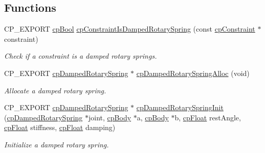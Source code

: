 \subsection*{Functions}
\begin{DoxyCompactItemize}
\item 
\mbox{\label{group__cp_damped_rotary_spring_ga699106f2d1aa35ac5ab214c4a5dd5a09}} 
C\+P\+\_\+\+E\+X\+P\+O\+RT \mbox{\hyperlink{group__basic_types_gabc5e752c48f3449ca26ef413ecbd647e}{cp\+Bool}} \mbox{\hyperlink{group__cp_damped_rotary_spring_ga699106f2d1aa35ac5ab214c4a5dd5a09}{cp\+Constraint\+Is\+Damped\+Rotary\+Spring}} (const \mbox{\hyperlink{structcp_constraint}{cp\+Constraint}} $\ast$constraint)
\begin{DoxyCompactList}\small\item\em Check if a constraint is a damped rotary springs. \end{DoxyCompactList}\item 
\mbox{\label{group__cp_damped_rotary_spring_ga7c383845b0947b2bb7140d9d5cc7c6fc}} 
C\+P\+\_\+\+E\+X\+P\+O\+RT \mbox{\hyperlink{structcp_damped_rotary_spring}{cp\+Damped\+Rotary\+Spring}} $\ast$ \mbox{\hyperlink{group__cp_damped_rotary_spring_ga7c383845b0947b2bb7140d9d5cc7c6fc}{cp\+Damped\+Rotary\+Spring\+Alloc}} (void)
\begin{DoxyCompactList}\small\item\em Allocate a damped rotary spring. \end{DoxyCompactList}\item 
\mbox{\label{group__cp_damped_rotary_spring_ga7e22b1d0c2bce96d499b356a7bc42104}} 
C\+P\+\_\+\+E\+X\+P\+O\+RT \mbox{\hyperlink{structcp_damped_rotary_spring}{cp\+Damped\+Rotary\+Spring}} $\ast$ \mbox{\hyperlink{group__cp_damped_rotary_spring_ga7e22b1d0c2bce96d499b356a7bc42104}{cp\+Damped\+Rotary\+Spring\+Init}} (\mbox{\hyperlink{structcp_damped_rotary_spring}{cp\+Damped\+Rotary\+Spring}} $\ast$joint, \mbox{\hyperlink{structcp_body}{cp\+Body}} $\ast$a, \mbox{\hyperlink{structcp_body}{cp\+Body}} $\ast$b, \mbox{\hyperlink{group__basic_types_gac1ed65573e035bf892505768c852d8d3}{cp\+Float}} rest\+Angle, \mbox{\hyperlink{group__basic_types_gac1ed65573e035bf892505768c852d8d3}{cp\+Float}} stiffness, \mbox{\hyperlink{group__basic_types_gac1ed65573e035bf892505768c852d8d3}{cp\+Float}} damping)
\begin{DoxyCompactList}\small\item\em Initialize a damped rotary spring. \end{DoxyCompactList}\item 

\end{DoxyCompactItemize}
